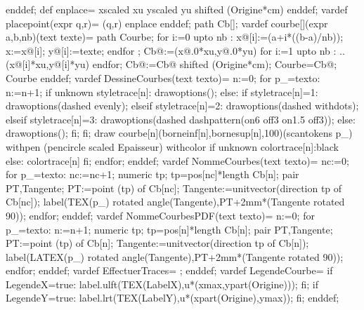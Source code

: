 {  enddef;
  def enplace=
    xscaled xu yscaled yu shifted (Origine*cm)
  enddef;
  vardef placepoint(expr q,r)=
   (q,r) enplace
  enddef;
  path Cb[];
  vardef courbe[](expr a,b,nb)(text texte)=
  path Courbe;
  for i:=0 upto nb :
  x@[i]:=(a+i*((b-a)/nb));
  x:=x@[i];
  y@[i]:=texte;
  endfor ;
  Cb@:=(x@.0*xu,y@.0*yu)
  for i:=1 upto nb :
  ..(x@[i]*xu,y@[i]*yu)
  endfor;
  Cb@:=Cb@ shifted (Origine*cm);
  Courbe=Cb@;
  Courbe
  enddef;
  vardef DessineCourbes(text texto)=
  n:=0;
  for p_=texto:
  n:=n+1;
  if unknown styletrace[n]:
  drawoptions();
  else:
  if styletrace[n]=1:
  drawoptions(dashed evenly);
  elseif styletrace[n]=2:
  drawoptions(dashed withdots);
  elseif styletrace[n]=3:
  drawoptions(dashed dashpattern(on6 off3 on1.5 off3));
  else:
  drawoptions();
  fi;
  fi;
  draw courbe[n](borneinf[n],bornesup[n],100)(scantokens p_) withpen (pencircle scaled Epaisseur) withcolor if unknown colortrace[n]:black else: colortrace[n] fi;
  endfor;
  enddef;
  vardef NommeCourbes(text texto)=
  nc:=0;
  for p_=texto:
  nc:=nc+1;
  numeric tp;
  tp=pos[nc]*length Cb[n];
  pair PT,Tangente;
  PT:=point (tp) of Cb[nc];
  Tangente:=unitvector(direction tp of Cb[nc]);
  label(TEX(p_) rotated angle(Tangente),PT+2mm*(Tangente rotated 90));
  endfor;
  enddef;
  vardef NommeCourbesPDF(text texto)=
  n:=0;
  for p_=texto:
  n:=n+1;
  numeric tp;
  tp=pos[n]*length Cb[n];
  pair PT,Tangente;
  PT:=point (tp) of Cb[n];
  Tangente:=unitvector(direction tp of Cb[n]);
  label(LATEX(p_) rotated angle(Tangente),PT+2mm*(Tangente rotated 90));
  endfor;
  enddef;
  vardef EffectuerTraces=
  ;
  enddef;
  vardef LegendeCourbe=
  if LegendeX=true:
  label.ulft(TEX(LabelX),u*(xmax,ypart(Origine)));
  fi;
  if LegendeY=true:
    label.lrt(TEX(LabelY),u*(xpart(Origine),ymax));
  fi;
  enddef;
}%

